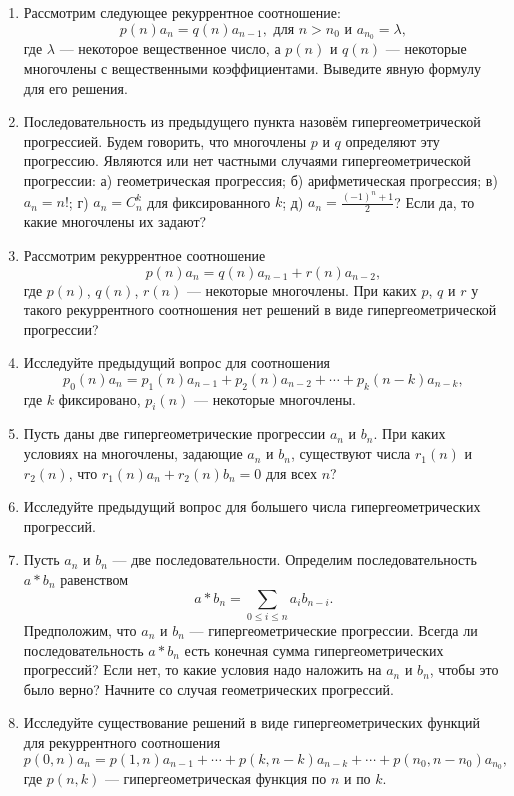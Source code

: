 \begin{enumerate}
\item Рассмотрим следующее рекуррентное соотношение:
$$p(n)a_{n}=q(n)a_{n-1}, \text{ для $n> n_0$ и } a_{n_0}=\lambda,$$
где $\lambda$ --- некоторое вещественное число, а $p(n)$ и $q(n)$ --- некоторые многочлены с вещественными коэффициентами. Выведите явную формулу для его решения.
\item Последовательность из предыдущего пункта назовём гипергеометрической прогрессией. Будем говорить, что многочлены $p$ и $q$ определяют эту прогрессию.  Являются или нет частными случаями гипергеометрической прогрессии: а) геометрическая прогрессия; б) арифметическая прогрессия; в) $a_n=n!$; г) $a_n=C_n^k$ для фиксированного $k$; д) $a_n= \tfrac{(-1)^n+1}{2}$? Если да, то какие многочлены их задают?
\item Рассмотрим рекуррентное соотношение 
$$p(n)a_{n}=q(n)a_{n-1} +r(n)a_{n-2},$$
где $p(n)$, $q(n)$, $r(n)$ --- некоторые многочлены. При каких $p$, $q$ и $r$ у такого рекуррентного соотношения нет решений в виде гипергеометрической прогрессии? 
\item Исследуйте предыдущий вопрос для соотношения 
$$p_0(n)a_{n}=p_1(n)a_{n-1} + p_2(n)a_{n-2}+\cdots+p_k(n-k)a_{n-k},$$
где $k$ фиксировано, $p_i(n)$ --- некоторые многочлены.
\item Пусть даны две гипергеометрические прогрессии $a_n$ и $b_n$. При каких условиях на многочлены, задающие $a_n$ и $b_n$, существуют числа $r_1(n)$ и $r_2(n)$, что $r_1(n) a_n + r_2(n) b_n=0$ для всех $n$? 
\item Исследуйте предыдущий вопрос для большего числа гипергеометрических прогрессий.
\item Пусть $a_n$ и $b_n$ --- две последовательности. Определим последовательность $a*b_n$ равенством 
$$a*b_n=\sum_{0\leq i\leq n} a_i b_{n-i}.$$
Предположим, что $a_n$ и $b_n$ --- гипергеометрические прогрессии. Всегда ли последовательность $a*b_n$ есть конечная сумма гипергеометрических прогрессий?  Если нет, то какие условия надо наложить на $a_n$ и $b_n$, чтобы это было верно? Начните со случая геометрических прогрессий.
\item Исследуйте существование решений в виде гипергеометрических функций для рекуррентного соотношения 
$$p(0,n)a_{n}=p(1,n)a_{n-1} +\cdots+p(k,n-k)a_{n-k}+ \cdots + p(n_0,n-n_0)a_{n_0},$$
где $p(n,k)$ --- гипергеометрическая функция по $n$ и по $k$.
\end{enumerate}


